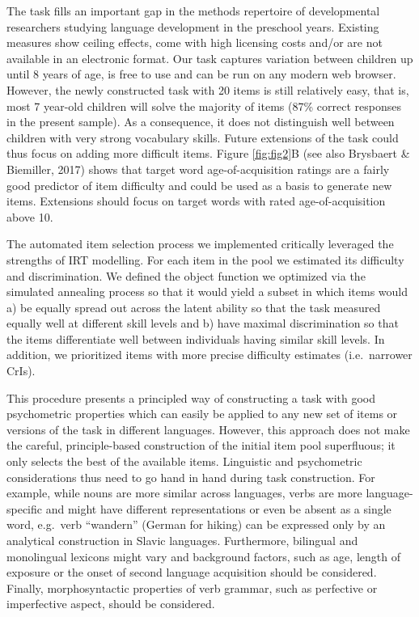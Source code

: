 \documentclass[
  man,floatsintext]{apa6}
\begin{document}
The task fills an important gap in the methods repertoire of developmental researchers studying language development in the preschool years. Existing measures show ceiling effects, come with high licensing costs and/or are not available in an electronic format. Our task captures variation between children up until 8 years of age, is free to use and can be run on any modern web browser. However, the newly constructed task with 20 items is still relatively easy, that is, most 7 year-old children will solve the majority of items (87\% correct responses in the present sample). As a consequence, it does not distinguish well between children with very strong vocabulary skills. Future extensions of the task could thus focus on adding more difficult items. Figure \ref{fig:fig2}B (see also Brysbaert \& Biemiller, 2017) shows that target word age-of-acquisition ratings are a fairly good predictor of item difficulty and could be used as a basis to generate new items. Extensions should focus on target words with rated age-of-acquisition above 10.

The automated item selection process we implemented critically leveraged the strengths of IRT modelling. For each item in the pool we estimated its difficulty and discrimination. We defined the object function we optimized via the simulated annealing process so that it would yield a subset in which items would a) be equally spread out across the latent ability so that the task measured equally well at different skill levels and b) have maximal discrimination so that the items differentiate well between individuals having similar skill levels. In addition, we prioritized items with more precise difficulty estimates (i.e.~narrower CrIs).

This procedure presents a principled way of constructing a task with good psychometric properties which can easily be applied to any new set of items or versions of the task in different languages. However, this approach does not make the careful, principle-based construction of the initial item pool superfluous; it only selects the best of the available items. Linguistic and psychometric considerations thus need to go hand in hand during task construction. For example, while nouns are more similar across languages, verbs are more language-specific and might have different representations or even be absent as a single word, e.g.~verb ``wandern'' (German for hiking) can be expressed only by an analytical construction in Slavic languages. Furthermore, bilingual and monolingual lexicons might vary and background factors, such as age, length of exposure or the onset of second language acquisition should be considered. Finally, morphosyntactic properties of verb grammar, such as perfective or imperfective aspect, should be considered.
\end{document}
